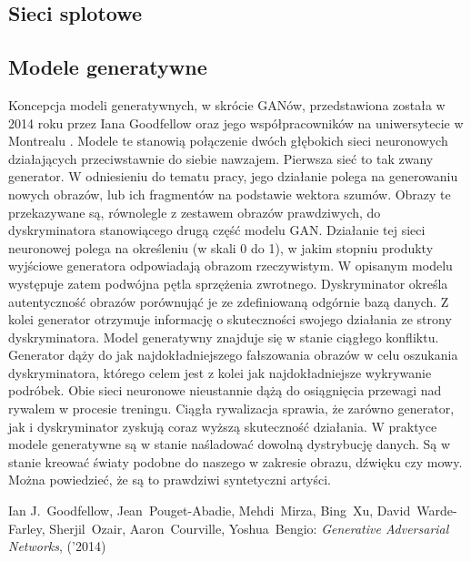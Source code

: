 \documentclass[12pt]{article}
\newcommand\tab[1][1cm]{\hspace*{#1}}
\begin{document}
  \subsection{Sieci splotowe}
  \tab

  \subsection{Modele generatywne}
  \tab Koncepcja modeli generatywnych, w skrócie GANów, przedstawiona została w 2014 roku przez Iana Goodfellow oraz jego współpracowników na uniwersytecie w Montrealu \cite{gan}. Modele te stanowią połączenie dwóch głębokich sieci neuronowych działających przeciwstawnie do siebie nawzajem.
  \newline \tab Pierwsza sieć to tak zwany generator. W odniesieniu do tematu pracy, jego działanie polega na generowaniu nowych obrazów, lub ich fragmentów na podstawie wektora szumów.
  \newline \tab Obrazy te przekazywane są, równolegle z zestawem obrazów prawdziwych, do dyskryminatora stanowiącego drugą część modelu GAN. Działanie tej sieci neuronowej polega na określeniu (w skali 0 do 1), w jakim stopniu produkty wyjściowe generatora odpowiadają obrazom rzeczywistym.
  \newline \tab W opisanym modelu występuje zatem podwójna pętla sprzężenia zwrotnego. Dyskryminator określa autentyczność obrazów porównująć je ze zdefiniowaną odgórnie bazą danych. Z kolei generator otrzymuje informację o skuteczności swojego działania ze strony dyskryminatora.
  \newline \tab Model generatywny znajduje się w stanie ciągłego konfliktu. Generator dąży do jak najdokładniejszego fałszowania obrazów w celu oszukania dyskryminatora, którego celem jest z kolei jak najdokładniejsze wykrywanie podróbek. Obie sieci neuronowe nieustannie dążą do osiągnięcia przewagi nad rywalem w procesie treningu. Ciągła rywalizacja sprawia, że zarówno generator, jak i dyskryminator zyskują coraz wyższą skuteczność działania.
  \newline \tab W praktyce modele generatywne są w stanie naśladować dowolną dystrybucję danych. Są w stanie kreować światy podobne do naszego w zakresie obrazu, dźwięku czy mowy. Można powiedzieć, że są to prawdziwi syntetyczni artyści.

\newpage
\begin{thebibliography}{99} %
   Ian J.~Goodfellow, Jean~Pouget-Abadie, Mehdi~Mirza, Bing~Xu, David~Warde-Farley, Sherjil~Ozair, Aaron~Courville, Yoshua~Bengio:
  \emph{Generative Adversarial Networks}, ('2014)
\end{thebibliography}
\end{document}
